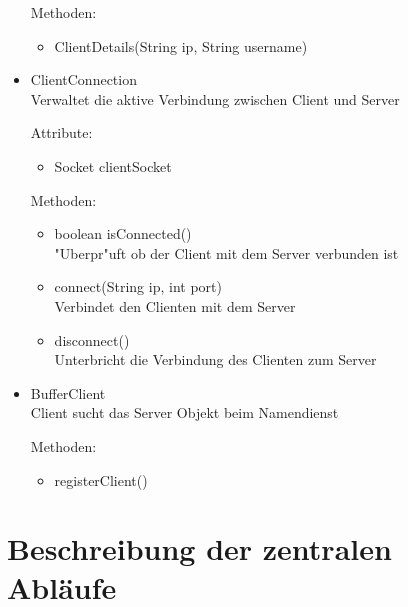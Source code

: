 \documentclass[a4paper,10pt]{article}
\begin{document}
\begin{itemize}
Methoden:
\begin{itemize}
\item ClientDetails(String ip, String username) 
\end{itemize}

\item ClientConnection \\
Verwaltet die aktive Verbindung zwischen Client und Server

Attribute:
\begin{itemize}
\item Socket clientSocket
\end{itemize}

Methoden:
\begin{itemize}
\item boolean isConnected()
\\"Uberpr"uft ob der Client mit dem Server verbunden ist
\item connect(String ip, int port)
\\Verbindet den Clienten mit dem Server
\item disconnect() 
\\Unterbricht die Verbindung des Clienten zum Server
\end{itemize}

\item BufferClient\\
Client sucht das Server Objekt beim Namendienst 

Methoden:
\begin{itemize}
\item registerClient() 
\end{itemize} %
\end{itemize} %

\section{Beschreibung der zentralen Abläufe}
\end{document}
